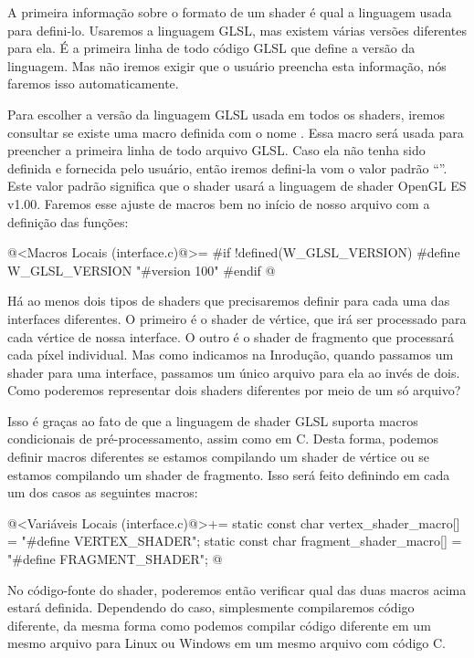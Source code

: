 A primeira informação sobre o formato de um shader é qual a linguagem
usada para defini-lo. Usaremos a linguagem GLSL, mas existem várias
versões diferentes para ela. É a primeira linha de todo código GLSL
que define a versão da linguagem. Mas não iremos exigir que o usuário
preencha esta informação, nós faremos isso automaticamente.

Para escolher a versão da linguagem GLSL usada em todos os shaders,
iremos consultar se existe uma macro definida com o nome
. Essa macro será usada para preencher a
primeira linha de todo arquivo GLSL. Caso ela não tenha sido definida
e fornecida pelo usuário, então iremos defini-la vom o valor padrão
``''. Este valor padrão significa que o
shader usará a linguagem de shader OpenGL ES v1.00. Faremos esse
ajuste de macros bem no início de nosso arquivo com a definição das
funções:

\iniciocodigo
@<Macros Locais (interface.c)@>=
#if !defined(W_GLSL_VERSION)
#define W_GLSL_VERSION "#version 100\n"
#endif
@
\fimcodigo

Há ao menos dois tipos de shaders que precisaremos definir para cada
uma das interfaces diferentes. O primeiro é o shader de vértice, que
irá ser processado para cada vértice de nossa interface. O outro é o
shader de fragmento que processará cada píxel individual. Mas como
indicamos na Inrodução, quando passamos um shader para uma interface,
passamos um único arquivo para ela ao invés de dois. Como poderemos
representar dois shaders diferentes por meio de um só arquivo?

Isso é graças ao fato de que a linguagem de shader GLSL suporta macros
condicionais de pré-processamento, assim como em C. Desta forma,
podemos definir macros diferentes se estamos compilando um shader de
vértice ou se estamos compilando um shader de fragmento. Isso será
feito definindo em cada um dos casos as seguintes macros:

\iniciocodigo
@<Variáveis Locais (interface.c)@>+=
static const char vertex_shader_macro[] = "#define VERTEX_SHADER\n";
static const char fragment_shader_macro[] = "#define FRAGMENT_SHADER\n";
@
\fimcodigo

No código-fonte do shader, poderemos então verificar qual das duas
macros acima estará definida. Dependendo do caso, simplesmente
compilaremos código diferente, da mesma forma como podemos compilar
código diferente em um mesmo arquivo para Linux ou Windows em um mesmo
arquivo com código C.

